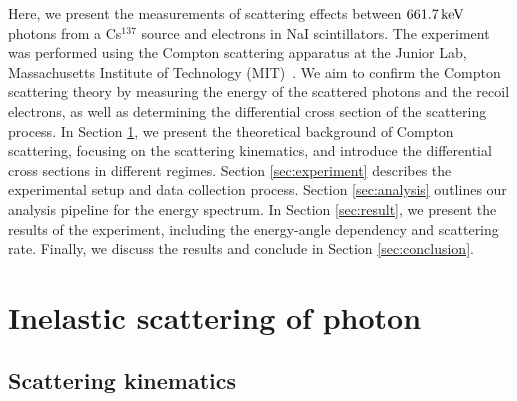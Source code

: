 \documentclass[aps,twocolumn,secnumarabic,balancelastpage,amsmath,amssymb,nofootinbib,floatfix]{revtex4-1}
\newcommand{\keV}{\,{\rm keV}}
\begin{document}
Here, we present the measurements of scattering effects between $661.7\keV$ photons from a Cs$^{137}$ source and electrons in NaI scintillators. The experiment was performed using the Compton scattering apparatus at the Junior Lab, Massachusetts Institute of Technology (MIT)~\cite{MIT2023}. We aim to confirm the Compton scattering theory by measuring the energy of the scattered photons and the recoil electrons, as well as determining the differential cross section of the scattering process. In Section \ref{sec:theory}, we present the theoretical background of Compton scattering, focusing on the scattering kinematics, and introduce the differential cross sections in different regimes. Section \ref{sec:experiment} describes the experimental setup and data collection process. Section \ref{sec:analysis} outlines our analysis pipeline for the energy spectrum. In Section \ref{sec:result}, we present the results of the experiment, including the energy-angle dependency and scattering rate. Finally, we discuss the results and conclude in Section \ref{sec:conclusion}.


\section{Inelastic scattering of photon}
\label{sec:theory}

\subsection{Scattering kinematics}
\label{ssec:scattering_kinematics}
\end{document}
